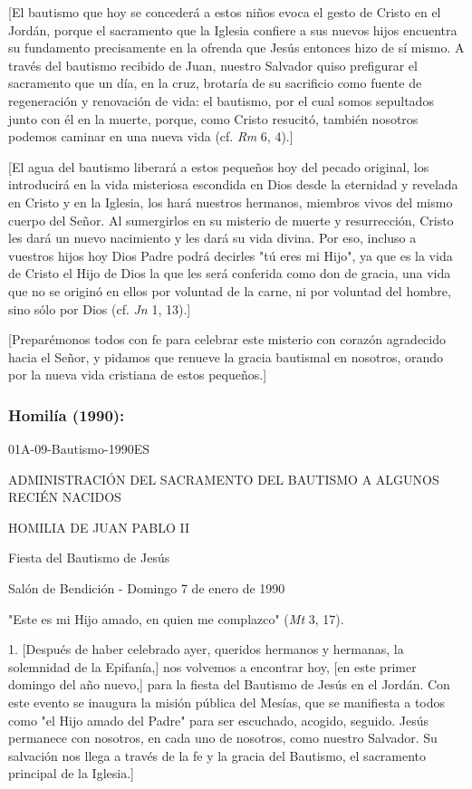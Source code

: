 {[}El bautismo que hoy se concederá a estos niños evoca el gesto de
Cristo en el Jordán, porque el sacramento que la Iglesia confiere a sus
nuevos hijos encuentra su fundamento precisamente en la ofrenda que
Jesús entonces hizo de sí mismo. A través del bautismo recibido de Juan,
nuestro Salvador quiso prefigurar el sacramento que un día, en la cruz,
brotaría de su sacrificio como fuente de regeneración y renovación de
vida: el bautismo, por el cual somos sepultados junto con él en la
muerte, porque, como Cristo resucitó, también nosotros podemos caminar
en una nueva vida (cf. \emph{Rm} 6, 4).{]}

{[}El agua del bautismo liberará a estos pequeños hoy del pecado
original, los introducirá en la vida misteriosa escondida en Dios desde
la eternidad y revelada en Cristo y en la Iglesia, los hará nuestros
hermanos, miembros vivos del mismo cuerpo del Señor. Al sumergirlos en
su misterio de muerte y resurrección, Cristo les dará un nuevo
nacimiento y les dará su vida divina. Por eso, incluso a vuestros hijos
hoy Dios Padre podrá decirles "tú eres mi Hijo", ya que es la vida de
Cristo el Hijo de Dios la que les será conferida como don de gracia, una
vida que no se originó en ellos por voluntad de la carne, ni por
voluntad del hombre, sino sólo por Dios (cf. \emph{Jn} 1, 13).{]}

{[}Preparémonos todos con fe para celebrar este misterio con corazón
agradecido hacia el Señor, y pidamos que renueve la gracia bautismal en
nosotros, orando por la nueva vida cristiana de estos pequeños.{]}

\subsubsection{Homilía (1990): }
01A-09-Bautismo-1990ES

ADMINISTRACIÓN DEL SACRAMENTO DEL BAUTISMO A ALGUNOS RECIÉN NACIDOS

HOMILIA DE JUAN PABLO II

Fiesta del Bautismo de Jesús

Salón de Bendición - Domingo 7 de enero de 1990

"Este es mi Hijo amado, en quien me complazco" (\emph{Mt} 3, 17).

1. {[}Después de haber celebrado ayer, queridos hermanos y hermanas, la
solemnidad de la Epifanía,{]} nos volvemos a encontrar hoy, {[}en este
primer domingo del año nuevo,{]} para la fiesta del Bautismo de Jesús en
el Jordán. Con este evento se inaugura la misión pública del Mesías, que
se manifiesta a todos como "el Hijo amado del Padre" para ser escuchado,
acogido, seguido. Jesús permanece con nosotros, en cada uno de nosotros,
como nuestro Salvador. Su salvación nos llega a través de la fe y la
gracia del Bautismo, el sacramento principal de la Iglesia.{]}

